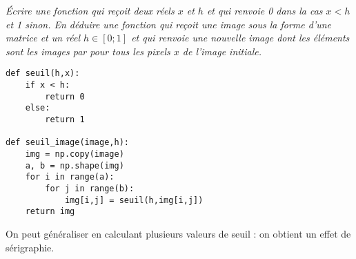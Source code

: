 \begin{Exercise}[title=Image en noir et blanc]\it Écrire une fonction  qui reçoit deux réels $x$ et $h$ et qui renvoie 0 dans la cas $x<h$ et 1 sinon.
En déduire une fonction  qui reçoit une image sous la forme d'une matrice  et un réel $h\in [0;1]$ et qui renvoie une nouvelle image dont les éléments sont les images par  pour tous les pixels $x$ de l'image initiale.
\end{Exercise}
\begin{Answer}
\begin{lstlisting}
def seuil(h,x):
    if x < h:
        return 0
    else:
        return 1
        
def seuil_image(image,h):
    img = np.copy(image)
    a, b = np.shape(img)
    for i in range(a):
        for j in range(b):
            img[i,j] = seuil(h,img[i,j])
    return img
\end{lstlisting}
\end{Answer}

\medskip

On peut généraliser en calculant plusieurs valeurs de seuil : on obtient un effet de sérigraphie.

